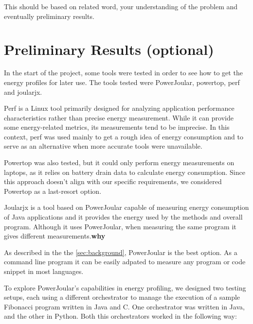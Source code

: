 \documentclass[sigplan]{acmart}
\begin{document}
This should be based on related word, your understanding of the problem and eventually preliminary results.

\section{Preliminary Results (optional)} \label{sec:preliminaryresults}

In the start of the project, some tools were tested in order to see how to get the energy profiles for later use. The tools tested were PowerJoular, powertop, perf and joularjx.

Perf is a Linux tool primarily designed for analyzing application performance characteristics rather than precise energy measurement. While it can provide some energy-related metrics, its measurements tend to be imprecise. In this context, perf was used mainly to get a rough idea of energy consumption and to serve as an alternative when more accurate tools were unavailable.

Powertop was also tested, but it could only perform energy measurements on laptops, as it relies on battery drain data to calculate energy consumption. Since this approach doesn't align with our specific requirements, we considered Powertop as a last-resort option.

Joularjx is a tool based on PowerJoular capable of measuring energy consumption of Java applications and it provides the energy used by the methods and overall program. Although it uses PowerJoular, when measuring the same program it gives different measurements.\textbf{why}

As described in the the \ref{sec:background}, PowerJoular is the best option. As a command line program it can be easily adpated to measure any program or code snippet in most languages.

To explore PowerJoular’s capabilities in energy profiling, we designed two testing setups, each using a different orchestrator to manage the execution of a sample Fibonacci program written in Java and C. One orchestrator was written in Java, and the other in Python. Both this orchestrators worked in the following way: \\
\end{document}
